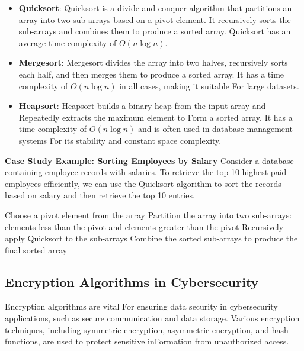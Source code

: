 \documentclass[12pt]{book} %
\begin{document}
\begin{itemize}
    \item \textbf{Quicksort}: Quicksort is a divide-and-conquer algorithm that partitions an array into two sub-arrays based on a pivot element. It recursively sorts the sub-arrays and combines them to produce a sorted array. Quicksort has an average time complexity of $O(n \log n)$.
    
    \item \textbf{Mergesort}: Mergesort divides the array into two halves, recursively sorts each half, and then merges them to produce a sorted array. It has a time complexity of $O(n \log n)$ in all cases, making it suitable For large datasets.
    
    \item \textbf{Heapsort}: Heapsort builds a binary heap from the input array and Repeatedly extracts the maximum element to Form a sorted array. It has a time complexity of $O(n \log n)$ and is often used in database management systems For its stability and constant space complexity.
\end{itemize}

\textbf{Case Study Example: Sorting Employees by Salary}
Consider a database containing employee records with salaries. To retrieve the top 10 highest-paid employees efficiently, we can use the Quicksort algorithm to sort the records based on salary and then retrieve the top 10 entries.
\FloatBarrier
\begin{algorithm}
\caption{Quicksort Algorithm For Sorting Employees by Salary}
\begin{algorithmic}[1]
\State Choose a pivot element from the array
\State Partition the array into two sub-arrays: elements less than the pivot and elements greater than the pivot
\State Recursively apply Quicksort to the sub-arrays
\State Combine the sorted sub-arrays to produce the final sorted array
\end{algorithmic}
\end{algorithm}

\FloatBarrier
\subsection{Encryption Algorithms in Cybersecurity}
Encryption algorithms are vital For ensuring data security in cybersecurity applications, such as secure communication and data storage. Various encryption techniques, including symmetric encryption, asymmetric encryption, and hash functions, are used to protect sensitive inFormation from unauthorized access.
\end{document}
